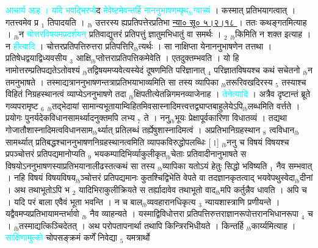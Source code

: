\documentclass[article,12pt,a4paper]{memoir}%
\newcommand{\quotelemma}[1]{\textcolor{cyan}{#1}}
\begin{document}
	  
	  \pstart \leavevmode%
	\hphantom{.}\quotelemma{आचार्य आह । यदि भवद्भिरप्ये\edtext{}{\lemma{प्ये}\Bfootnote{? पी}}}द \quotelemma{मेवेष्टमेवन्तर्हि नाननुभाषणम्पृथ{\tiny $_{lb}$}ग्वाच्यं} \cite[16b9]{vn-msN} । कस्मात् प्रतिभयागत्वात् । गतत्त्वमेव प्र {\tiny $_{1}$} तिपादयति । {\tiny $_{lb}$} उत्तरस्य ह्यप्रतिपत्तेरप्रतिभा \href{http://sarit.indology.info/?cref=ns\%C5\%AB.5.2.18}{न्या० सू० ५।२।१८ } । ततः कथङ्गतमित्याह । {\tiny $_{lb}$}न \quotelemma{चोत्तरविषयमप्रदर्शयन्} प्रतिवाद्युत्तरं प्रतिपत्तुं ज्ञातुमभिधातुं वा समर्थः । {\tiny $_{2}$} {\tiny $_{lb}$}किमिति न शक्त इत्याह । न \quotelemma{हीत्यादि} । चोत्तरप्रतिपत्तिरुत्तरा प्रतिपत्तिरि{\tiny $_{lb}$}त्यर्थः । सा नाक्षिप्ता येनाननुभाषणेन तत्तथा । प्रतिषेधद्वयाद्विध्यवसीय {\tiny $_{3}$} आक्षि{\tiny $_{lb}$}प्तोत्तराप्रतिपत्तिकमेवेति । एतदुक्तम्भवति । यो हि नामोत्तरम्प्रतिपद्यतेऽतोवश्यं {\tiny $_{lb}$}तद्विषयमप्यवेत्यस्येदं दूषणमिति परिज्ञानात् {\tiny $_{4}$} परिज्ञातविषयश्च कथं सचेतनो {\tiny $_{lb}$}न तमनुभाषते । तस्माद्यत्राननुभाषणन्तत्राप्रतिभयाभाव्यमिति सा तस्य व्यापिका {\tiny $_{lb}$}तरूरिवखदिरस्य {\tiny $_{5}$} तस्याश्च विहितं निग्रहस्थानत्वं व्याप्येऽननुभाषणे तदा {\tiny $_{lb}$}क्षिपतीत्येतन्निगमनव्याजेनाह । \quotelemma{तेनेत्यादि} । अत्रैव दृष्टान्तं ब्रूते गव्यपरामृष्ट {\tiny $_{6}$} {\tiny $_{lb}$}तद्भेदायां सामान्यभूतायाम्विहितमिवसास्नादिमत्त्वत्तद्व्याप्तबाहुलेयेऽपि{\tiny $_{lb}$}लब्धमिति वर्त्तते । प्रयोगः पुनर्यदेकविधानसामर्थ्यादनुक्तमपि लभ्य {\tiny $_{7}$} ते । ननु{\tiny $_{lb}$}भूयः प्रेक्षापूर्वकारिणा विधातव्यं । तद्यथा गोजातौशास्नादिमत्वविधानसाम{\tiny $_{lb}$}र्थ्यात् प्रतिलब्धं तर्ह्येषुशास्नादिमत्वं । अप्रतिभानिग्रहस्थान {\tiny $_{8}$} त्वविधान{\tiny $_{lb}$}सामर्थ्यात् प्रतिबद्धश्चाननुभाषणनिग्रहस्थानत्वमिति व्यापकविरुद्धोपलब्धिः [।] {\tiny $_{lb}$}ननु च विषयं विषयश्च प्रपञ्चोत्तरं प्रतिपद्यमानोप्यति {\tiny $_{9}$} \leavevmode{} भयकम्पादिभिर्व्याकुलीकृत{\tiny $_{lb}$}चेताः प्रतिवादीनानुभाषते स विषयोऽननुभाषणस्याप्रतिभयानालीढस्तत्कथं सा तस्य {\tiny $_{lb}$}व्यापिका यतोऽयं हेतुः सिद्धो भविष्यति {\tiny $_{1}$} नैव सम्भवात् । नहि विषयं विषयविषय{\tiny $_{lb}$}ञ्चोत्तरं प्रतिपद्यमानः कुतश्चिद्विभेति वेपते वा तदज्ञानकृतत्वाद् भयवेपथुस्वेदा{\tiny $_{lb}$}दीनां । अथ तथाभूतोऽपि भ {\tiny $_{2}$} यादिभिराकुलीक्रियते स तर्ह्यादावेव तथाभूतो वाद{\tiny $_{lb}$}मपि कर्तुन्नैव धावति । अपि च । यदि परं बाला एवैवं भूता भवन्ति । न च बाल{\tiny $_{lb}$}व्यवहारानधिकृत्य {\tiny $_{3}$} न्यायशास्त्राणि प्रणीयन्ते । यद्वैवमप्यप्रतिभायामन्तर्भावो {\tiny $_{lb}$} \leavevmode{} नैव व्याहन्यते । यस्माद्विविधोत्तरा प्रतिपत्तिरुत्तराज्ञानरूपोत्तरानभिधानरूपा {\tiny $_{4}$} च । {\tiny $_{lb}$}तस्माद्यत्किञ्चिदेतत् । अथ परोपतापनार्था तथापि किन्त्रिरभिधीयते । किन्तर्हि {\tiny $_{lb}$}कार्य्यमित्याह । \quotelemma{साक्षिणामुत्को} चोपसङ्क्रमं कर्णें निवेद्या {\tiny $_{5}$} यमत्रार्थो 
\end{document}
